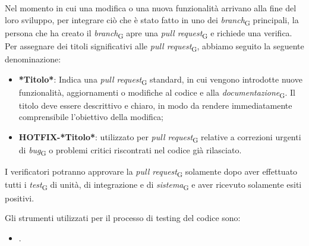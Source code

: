 Nel momento in cui una modifica o una nuova funzionalità arrivano alla fine del loro sviluppo, per integrare ciò che è stato fatto in uno dei \textit{branch}\textsubscript{G} principali, la persona che ha creato il \textit{branch}\textsubscript{G} apre una \textit{pull request}\textsubscript{G} e richiede una verifica. \\
Per assegnare dei titoli significativi alle \textit{pull request}\textsubscript{G}, abbiamo seguito la seguente denominazione:
\begin{itemize}
    \item \textbf{*Titolo*}: Indica una \textit{pull request}\textsubscript{G} standard, in cui vengono introdotte nuove funzionalità, aggiornamenti o modifiche al codice e alla \textit{documentazione}\textsubscript{G}. Il titolo deve essere descrittivo e chiaro, in modo da rendere immediatamente comprensibile l'obiettivo della modifica;
    \item \textbf{HOTFIX-*Titolo*}: utilizzato per \textit{pull request}\textsubscript{G} relative a correzioni urgenti di \textit{bug}\textsubscript{G} o problemi critici riscontrati nel codice già rilasciato.
\end{itemize}
I verificatori potranno approvare la \textit{pull request}\textsubscript{G} solamente dopo aver effettuato tutti i \textit{test}\textsubscript{G} di unità, di integrazione e di \textit{sistema}\textsubscript{G} e aver ricevuto solamente esiti positivi.

Gli strumenti utilizzati per il processo di testing del codice sono:
\begin{itemize}
    \item {}.
\end{itemize}